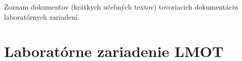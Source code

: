 \documentclass[a4paper, 10pt, ]{article}
\begin{document}

\normalsize
\normalfont

\noindent
Zoznam dokumentov (krátkych učebných textov) tovoriacich dokumentáciu laboratórnych zariadení.


\vspace{32pt}




\section{Laboratórne zariadenie LMOT}





    



%     






    



%     

\end{document}
